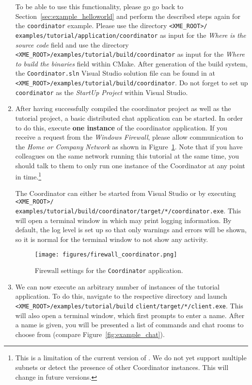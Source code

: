 \begin{enumerate}
		To be able to use this functionality, please go go back to Section~\ref{sec:example_helloworld}
		and perform the described steps again for the \verb|coordinator| example.
		Please use the directory \verb|<XME_ROOT>/| \verb|examples/tutorial/application/coordinator| as input for the \emph{Where is the source code} field
		and use the directory \verb|<XME_ROOT>/examples/tutorial/build/coordinator| as input for the
		\emph{Where to build the binaries} field within CMake.
		After generation of the build system, the \verb|Coordinator.sln| Visual Studio solution file
		can be found in at \verb|<XME_ROOT>/examples/tutorial/build/coordinator|.
		Do not forget to set up \verb|coordinator| as the \emph{StartUp Project} within Visual Studio.
		
	\item After having successfully compiled the coordinator project as well as the tutorial project,
		a basic distributed chat application can be started.
		In order to do this, execute {\bf one instance} of the coordinator application.
		If you receive a request from the \emph{Windows Firewall},
		please allow communication to the \emph{Home or Company Network} as shown in Figure~\ref{fig:firewall_coordinator}.
		Note that if you have colleagues on the same network running this tutorial at the same time,
		you should talk to them to only run one instance of the Coordinator at any point in time.\footnote{%
			This is a limitation of the current version of \xme. We do not yet support multiple subnets
			or detect the presence of other Coordinator instances. This will change in future versions.}
		
		The Coordinator can either be started from Visual Studio or by executing \verb|<XME_ROOT>/|
		\verb|examples/tutorial/build/coordinator/target/*/coordinator.exe|.
		This will open a terminal window in which \xme may print logging information.
		By default, the log level is set up so that only warnings and errors will be shown,
		so it is normal for the terminal window to not show any activity.

\begin{figure}[htpb]
	\centering
	\texttt{[image: figures/firewall\_coordinator.png]}
	\caption{Firewall settings for the \texttt{Coordinator} application.}
	\label{fig:firewall_coordinator}
\end{figure}

	\item We can now execute an arbitrary number of instances of the tutorial application.
		To do this, navigate to the respective directory and launch
		\verb|<XME_ROOT>/examples/tutorial/build| \verb|client/target/*/client.exe|.
		This will also open a terminal window, which first prompts to enter a name.
		After a name is given, you will be presented a list of commands and chat rooms to choose from
		(compare Figure~\ref{fig:example_chat}).


\end{enumerate}
